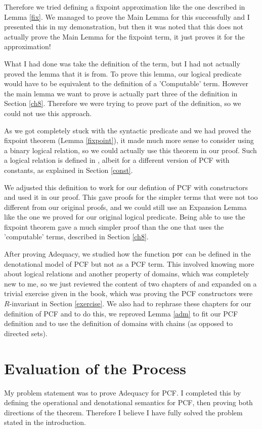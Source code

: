 Therefore we tried defining a fixpoint approximation like the one described in Lemma \ref{fix}. We managed to prove the Main Lemma for this successfully and I presented this in my demonstration, but then it was noted that this does not actually prove the Main Lemma for the fixpoint term, it just proves it for the approximation! 

What I had done was take the definition of the term, but I had not actually proved the lemma that it is from. To prove this lemma, our logical predicate would have to be equivalent to the definition of a 'Computable' term. However the main lemma we want to prove is actually part three of the definition in Section \ref{ch8}. Therefore we were trying to prove part of the definition, so we could not use this approach. 

As we got completely stuck with the syntactic predicate and we had proved the fixpoint theorem (Lemma \ref{fixpoint}), it made much more sense to consider using a binary logical relation, so we could actually use this theorem in our proof. Such a logical relation is defined in \citep{Streicher06} , albeit for a different version of PCF with constants, as explained in Section \ref{const}. 

We adjusted this definition to work for our defintion of PCF with constructors and used it in our proof. This gave proofs for the simpler terms that were not too different from our  original proofs, and we could still use an Expansion Lemma like the one we proved for our original logical predicate. Being able to use the fixpoint theorem gave a much simpler proof than the one that uses the 'computable' terms, described in Section \ref{ch8}. 

After proving Adequacy, we studied how the function $\operatorname{por}$ can be defined in the denotational model of PCF but not as a PCF term. This involved knowing more about logical relations and another property of domains, which was completely new to me, so we just reviewed the content of two chapters of \citep{Streicher06} and expanded on a trivial exercise given in the book, which was proving the PCF constructors were $R$-invariant in Section \ref{exercise}. We also had to rephrase these chapters for our definition of PCF and to do this, we reproved Lemma \ref{adm} to fit our PCF definition and to use the definition of domains with chains (as opposed to directed sets).

\section{Evaluation of the Process} 
My problem statement was to prove Adequacy for PCF. I completed this by defining the operational and denotational semantics for PCF, then proving both directions of the theorem. Therefore I believe I have fully solved the problem stated in the introduction. 

